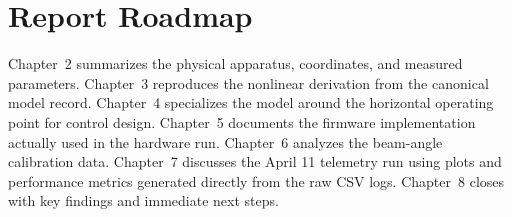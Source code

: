 \section{Report Roadmap}

Chapter~2 summarizes the physical apparatus, coordinates, and measured parameters.
Chapter~3 reproduces the nonlinear derivation from the canonical model record.
Chapter~4 specializes the model around the horizontal operating point for control
design. Chapter~5 documents the firmware implementation actually used in the hardware
run. Chapter~6 analyzes the beam-angle calibration data. Chapter~7 discusses the April
11 telemetry run using plots and performance metrics generated directly from the raw
CSV logs. Chapter~8 closes with key findings and immediate next steps.
